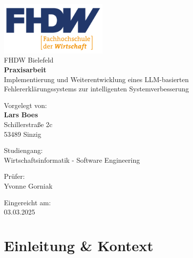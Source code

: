 \documentclass[
  a4paper,
  12pt,
  oneside,
  open=any,
  BCOR=12mm,
  DIV=14,
  parskip=half*,
  headsepline,
  footsepline,
  pointlessnumbers,
  liststotoc,
  numbers=noenddot,
  listof=totoc]{scrartcl}
\author{}
\date{}
\renewcommand*\contentsname{Inhaltsverzeichnis}
\newcommand\contentsname{Inhaltsverzeichnis}
\begin{document}
  
\newcommand{\kooperationsunternehmen}{Deutsche Telekom Technik GmbH}



  \begin{titlepage}
  \begin{center}
  \includegraphics[width=0.4\textwidth]{./img/fhdw.png}\\
  \Large{FHDW Bielefeld}
  \vspace{2mm}\\
  \Large{\bfseries Praxisarbeit}
  \vspace{6mm}\\
  \LARGE{Implementierung und Weiterentwicklung eines LLM-basierten
  Fehlererklärungssystems zur intelligenten Systemverbesserung}
  \vfill

  \large{
  Vorgelegt von:\vspace{2mm}\\
  \textbf{Lars Boes}\\
  Schillerstraße 2c\\
  53489 Sinzig

  \vfill
  Studiengang:\vspace{2mm}\\
  Wirtschaftsinformatik - Software Engineering

  \vfill
  Prüfer:\vspace{2mm}\\
  Yvonne Gorniak

  \vfill
  Eingereicht am:\vspace{2mm}\\
  03.03.2025
  }
  \end{center}
  \end{titlepage}
  



\clearpage

\renewcommand*\contentsname{Inhaltsverzeichnis}
{
\setcounter{tocdepth}{3}
\tableofcontents
}
\clearpage
\listoffigures
\listoftables
\clearpage%

\clearpage
\clearpage%
\section{Einleitung \& Kontext}\label{einleitung-kontext}
\end{document}
